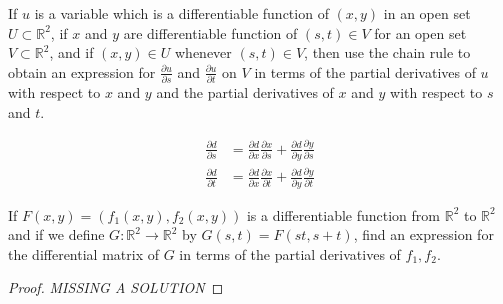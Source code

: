 \documentclass[12pt]{book}
\newcommand{\R}{\mathbb{R}}
\newenvironment{exercise}[2][Exercise]{\begin{trivlist}
\item[\hskip \labelsep {\bfseries #1}\hskip \labelsep {\bfseries #2.}]}{\end{trivlist}}
\begin{document}
\begin{exercise}{9.3.6}
	If $u$ is a variable which is a differentiable function of $(x,y)$ in an open set $U \subset \R^2$, if $x$ and $y$ are differentiable function of $(s,t) \in V$ for an open set $V \subset \R^2$, and if $(x,y) \in U$ whenever $(s,t) \in V$, then use the chain rule  to  obtain an expression for $\frac{\partial u}{\partial s}$ and $\frac{\partial u}{\partial t}$ on $V$ in terms of the partial derivatives of $u$ with respect to $x$ and $y$ and the partial derivatives of $x$ and $y$ with respect to $s$ and $t$.

    \begin{align*}
    \frac{\partial d}{\partial s} &= \frac{\partial d}{\partial x} \frac{\partial x}{\partial s} + \frac{\partial d}{\partial y} \frac{\partial y}{\partial s} \\
    \frac{\partial d }{\partial t} &= \frac{\partial d}{\partial x} \frac{\partial x}{\partial t} + \frac{\partial d }{\partial y} \frac{\partial y}{\partial t} 
    \end{align*}
\end{exercise}



\begin{exercise}{9.3.8}
	If $F(x,y) = \left( f_1 (x,y), f_2 (x, y) \right)$ is a differentiable function from $\R^2$ to $\R^2$ and if we define $G: \R^2 \to \R^2$ by $G(s, t) = F(s t, s+t)$, find an expression for the differential matrix of $G$ in terms of the partial derivatives of $f_1, f_2$.

	\begin{proof}
	\emph{MISSING A SOLUTION}
	\end{proof}
\end{exercise}
\end{document}
